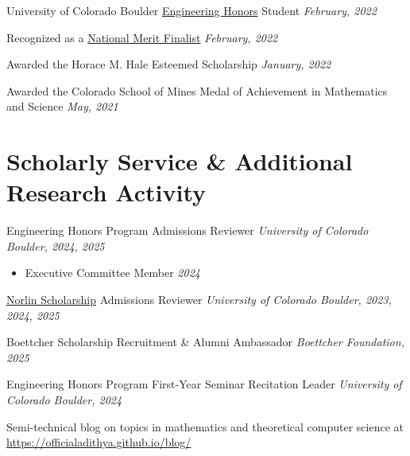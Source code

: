 \documentclass[a4paper,20pt]{article}
\begin{document}
\begin{description}[font=$\bullet$]
  \vspace{-5pt}
  \item {University of Colorado Boulder \href{https://cuengineeringhonors.com}{Engineering Honors} Student \hfill \textit{February, 2022}}
  \vspace{-5pt}
  \item {Recognized as a \href{https://www.nationalmerit.org}{National Merit Finalist} \hfill \textit{February, 2022}}
  \vspace{-5pt}
  \item {Awarded the Horace M. Hale Esteemed Scholarship \hfill \textit{January, 2022}}
  \vspace{-5pt}
  \item {Awarded the Colorado School of Mines Medal of Achievement in Mathematics and Science \hfill \textit{May, 2021}}
  \end{description}
  \section{Scholarly Service \& Additional Research Activity}
    \begin{description}[font=$\bullet$]
    \item Engineering Honors Program Admissions Reviewer \hfill \textit{University of Colorado Boulder, 2024, 2025}
    \vspace{-5pt}
    \begin{itemize}[label=-]
      \item Executive Committee Member \hspace{\fill} \textit{2024}
    \end{itemize}
    \vspace{-10pt}
    \item \href{https://www.colorado.edu/boettcher-daniels-norlin-scholars/norlin-scholars}{Norlin Scholarship} Admissions Reviewer \hfill \textit{University of Colorado Boulder, 2023, 2024, 2025}
    \vspace{-5pt}
    \item Boettcher Scholarship Recruitment \& Alumni Ambassador \hfill \textit{Boettcher Foundation, 2025}
    \vspace{-5pt}
    \item Engineering Honors Program First-Year Seminar Recitation Leader \hfill \textit{University of Colorado Boulder, 2024}
    \vspace{-5pt}
    \item Semi-technical blog on topics in mathematics and theoretical computer science at \href{https://officialadithya.github.io/blog/}{https://officialadithya.github.io/blog/}
    \vspace{-5pt}
    \end{description}
\end{document}
